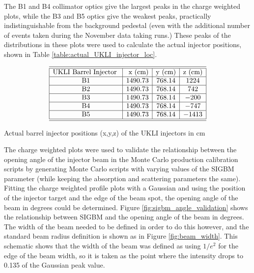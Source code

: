 The B1 and B4 collimator optics give the largest peaks in the charge weighted plots, while the B3 and B5 optics give the weakest peaks, practically indistinguishable from the background pedestal (even with the additional number of events taken during the November data taking runs.) These peaks of the distributions in these plots were used to calculate the actual injector positions, shown in Table \ref{table:actual_UKLI_injector_loc}. 

\begin{table}[htp]
    $$
\begin{array}{|c|c|c|c|c|c|}  
    \hline \hline{\text {UKLI Barrel Injector }} & {\text { x (cm)}} & {\text {y (cm)}} & {\text {z (cm)}}  \tabularnewline
    \hline \text { B1 } & 1490.73 & 768.14 & 1224 \\
    \hline \text { B2 } & 1490.73 & 768.14 & 742 \\
    \hline \text { B3 } & 1490.73 & 768.14 & -200 \\
    \hline \text { B4 } & 1490.73 & 768.14 & -747 \\
    \hline \text { B5 } & 1490.73 & 768.14 &  -1413 \\
    \hline \hline 
\end{array}
    $$
\caption{Actual barrel injector positions (x,y,z) of the UKLI injectors in cm} 
\label{table:actual_UKLI_injector_loc}
\end{table}

The charge weighted plots were used to validate the relationship between the opening angle of the injector beam in the Monte Carlo production calibration scripts by generating Monte Carlo scripts with varying values of the SIGBM parameter (while keeping the absorption and scattering parameters the same). Fitting the charge weighted profile plots with a Gaussian and using the position of the injector target and the edge of the beam spot, the opening angle of the beam in degrees could be determined. Figure \ref{fig:sigbm_angle_validation} shows the relationship between SIGBM and the opening angle of the beam in degrees. The width of the beam needed to be defined in order to do this however, and the standard beam radius definition is shown as in Figure \ref{fig:beam_width}. This schematic shows that the width of the beam was defined as using $1/e^2$ for the edge of the beam width, so it is taken as the point where the intensity drops to 0.135 of the Gaussian peak value.


